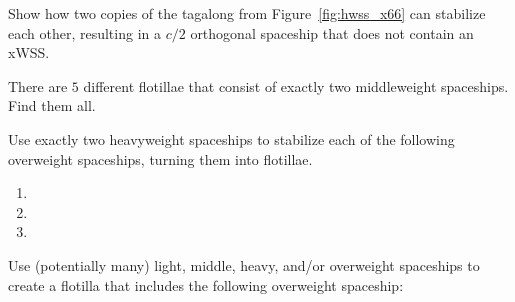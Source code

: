 \begin{multicols}{2}
	
	\mfilbreak
	
	
	\begin{problem}\label{exer:x66} 
		Show how two copies of the tagalong from Figure~\ref{fig:hwss_x66} can stabilize each other, resulting in a $c/2$ orthogonal spaceship that does not contain an xWSS.
	\end{problem}
	
	
	\mfilbreak
	
	
	\begin{problem}\label{exer:mwss_flotilla} 
		There are $5$ different flotillae that consist of exactly two middleweight spaceships. Find them all.
	\end{problem}
	
	
	\mfilbreak
	
	
	\begin{problemstar}\label{exer:owss_flotilla} 
		Use exactly two heavyweight spaceships to stabilize each of the following overweight spaceships, turning them into flotillae.\setlength{\columnsep}{-15pt}\vspace*{-0.25cm}
		
		\begin{multicols}{2}
			\begin{enumerate}
				\item[\bf\color{ocre}(a)] 
				
				\item[\bf\color{ocre}(c)] 
				
				\item[\bf\color{ocre}(b)] 
			\end{enumerate}
		\end{multicols}
	\end{problemstar}
	
	
	\mfilbreak
	
	
	\begin{problemstar}\label{exer:large_owss_flotilla} 
		Use (potentially many) light, middle, heavy, and/or overweight spaceships to create a flotilla that includes the following overweight spaceship:
		
		\begin{center}
		\end{center}
	\end{problemstar}
	

\end{multicols}
